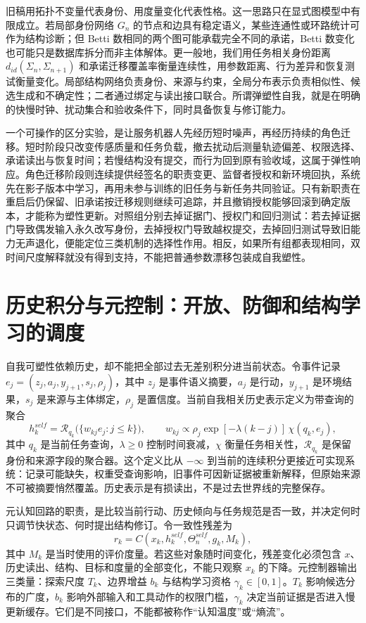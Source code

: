 旧稿用拓扑不变量代表身份、用度量变化代表性格。这一思路只在显式图模型中有限成立。若局部身份网络 $G_n$ 的节点和边具有稳定语义，某些连通性或环路统计可作为结构诊断；但 Betti 数相同的两个图可能承载完全不同的承诺，Betti 数变化也可能只是数据库拆分而非主体解体。更一般地，我们用任务相关身份距离 $d_{id}(\Sigma_n,\Sigma_{n+1})$ 和承诺迁移覆盖率衡量连续性，用参数距离、行为差异和恢复测试衡量变化。局部结构网络负责身份、来源与约束，全局分布表示负责相似性、候选生成和不确定性；二者通过绑定与读出接口联合。所谓弹塑性自我，就是在明确的快慢时钟、扰动集合和验收条件下，同时具备恢复与修订能力。

一个可操作的区分实验，是让服务机器人先经历短时噪声，再经历持续的角色迁移。短时阶段只改变传感质量和任务负载，撤去扰动后测量轨迹偏差、权限选择、承诺读出与恢复时间；若慢结构没有提交，而行为回到原有验收域，这属于弹性响应。角色迁移阶段则连续提供经签名的职责变更、监督者授权和新环境回执，系统先在影子版本中学习，再用未参与训练的旧任务与新任务共同验证。只有新职责在重启后仍保留、旧承诺按迁移规则继续可追踪，并且撤销授权能够回滚到确定版本，才能称为塑性更新。对照组分别去掉证据门、授权门和回归测试：若去掉证据门导致偶发输入永久改写身份，去掉授权门导致越权提交，去掉回归测试导致旧能力无声退化，便能定位三类机制的选择性作用。相反，如果所有组都表现相同，双时间尺度解释就没有得到支持，不能把普通参数漂移包装成自我塑性。

\section{历史积分与元控制：开放、防御和结构学习的调度}
\label{sec:section_8102}

自我可塑性依赖历史，却不能把全部过去无差别积分进当前状态。令事件记录 $e_j=(z_j,a_j,y_{j+1},s_j,\rho_j)$，其中 $z_j$ 是事件语义摘要，$a_j$ 是行动，$y_{j+1}$ 是环境结果，$s_j$ 是来源与主体绑定，$\rho_j$ 是置信度。当前自我相关历史表示定义为带查询的聚合
\[
h_k^{self}=\mathcal{R}_{q_k}\bigl(\{w_{kj}e_j:j\le k\}\bigr),\qquad
w_{kj}\propto \rho_j\exp[-\lambda(k-j)]\,\chi(q_k,e_j),
\]
其中 $q_k$ 是当前任务查询，$\lambda\ge0$ 控制时间衰减，$\chi$ 衡量任务相关性，$\mathcal{R}_{q_k}$ 是保留身份和来源字段的聚合器。这个定义比从 $-\infty$ 到当前的连续积分更接近可实现系统：记录可能缺失，权重受查询影响，旧事件可因新证据被重新解释，但原始来源不可被摘要悄然覆盖。历史表示是有损读出，不是过去世界线的完整保存。

元认知回路的职责，是比较当前行动、历史倾向与任务规范是否一致，并决定何时只调节快状态、何时提出结构修订。令一致性残差为
\[
r_k=C(x_k,h_k^{self},\Theta_n^{self},g_k,M_k),
\]
其中 $M_k$ 是当时使用的评价度量。若这些对象随时间变化，残差变化必须包含 $x$、历史读出、结构、目标和度量的全部变化，不能只观察 $x_k$ 的下降。元控制器输出三类量：探索尺度 $T_k$、边界增益 $b_k$ 与结构学习资格 $\gamma_k\in[0,1]$。$T_k$ 影响候选分布的广度，$b_k$ 影响外部输入和工具动作的权限门槛，$\gamma_k$ 决定当前证据是否进入慢更新缓存。它们是不同接口，不能都被称作“认知温度”或“熵流”。

